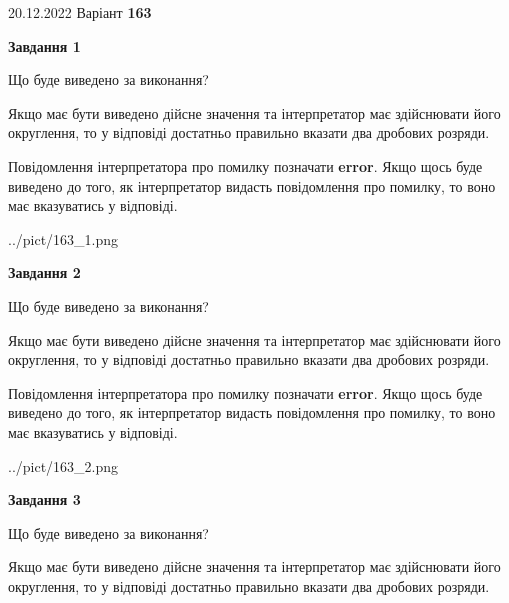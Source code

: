 \documentclass[12pt, ukrainian]{article}
\begin{document}
{20.12.2022 Варіант \No \textbf { 163 }\par}
{
\begin {Large}

{\begin {center}\textbf{Завдання 1}\end {center}}\par
Що буде виведено за виконання? \par

Якщо має бути виведено дійсне значення та інтерпретатор має здійснювати його округлення, 
то у відповіді достатньо правильно вказати два дробових розряди.

Повідомлення інтерпретатора про помилку позначати \textbf{error}.
Якщо щось буде виведено до того, як інтерпретатор видасть повідомлення про помилку, 
то воно має вказуватись у відповіді. \par

\begin{center}
	{../pict/163_1.png}
\end{center}
\newpage

{\begin {center}\textbf{Завдання 2}\end {center}}\par
Що буде виведено за виконання? \par

Якщо має бути виведено дійсне значення та інтерпретатор має здійснювати його округлення, 
то у відповіді достатньо правильно вказати два дробових розряди.

Повідомлення інтерпретатора про помилку позначати \textbf{error}.
Якщо щось буде виведено до того, як інтерпретатор видасть повідомлення про помилку, 
то воно має вказуватись у відповіді. \par

\begin{center}
	{../pict/163_2.png}
\end{center}
\newpage

{\begin {center}\textbf{Завдання 3}\end {center}}\par
Що буде виведено за виконання? \par

Якщо має бути виведено дійсне значення та інтерпретатор має здійснювати його округлення, 
то у відповіді достатньо правильно вказати два дробових розряди.


\end{Large}}
\end{document}
